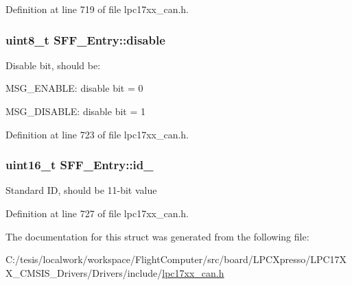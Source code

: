 \-Definition at line 719 of file lpc17xx\-\_\-can.\-h.

\hypertarget{struct_s_f_f___entry_a78b7636c1bee65d36cc2b75a43d0eca9}{
\subsubsection[{disable}]{\setlength{\rightskip}{0pt plus 5cm}uint8\-\_\-t {\bf \-S\-F\-F\-\_\-\-Entry\-::disable}}}\label{struct_s_f_f___entry_a78b7636c1bee65d36cc2b75a43d0eca9}
\-Disable bit, should be\-:
\begin{DoxyItemize}
\item \-M\-S\-G\-\_\-\-E\-N\-A\-B\-L\-E\-: disable bit = 0
\item \-M\-S\-G\-\_\-\-D\-I\-S\-A\-B\-L\-E\-: disable bit = 1 
\end{DoxyItemize}

\-Definition at line 723 of file lpc17xx\-\_\-can.\-h.

\hypertarget{struct_s_f_f___entry_ae0f5f1558274ca4ac8db92809b378198}{
\subsubsection[{id\-\_\-11}]{\setlength{\rightskip}{0pt plus 5cm}uint16\-\_\-t {\bf \-S\-F\-F\-\_\-\-Entry\-::id\-\_}}}\label{struct_s_f_f___entry_ae0f5f1558274ca4ac8db92809b378198}
\-Standard \-I\-D, should be 11-\/bit value 

\-Definition at line 727 of file lpc17xx\-\_\-can.\-h.



\-The documentation for this struct was generated from the following file\-:\begin{DoxyCompactItemize}
\item 
\-C\-:/tesis/localwork/workspace/\-Flight\-Computer/src/board/\-L\-P\-C\-Xpresso/\-L\-P\-C17\-X\-X\-\_\-\-C\-M\-S\-I\-S\-\_\-\-Drivers/\-Drivers/include/\hyperlink{lpc17xx__can_8h}{lpc17xx\-\_\-can.\-h}\end{DoxyCompactItemize}
